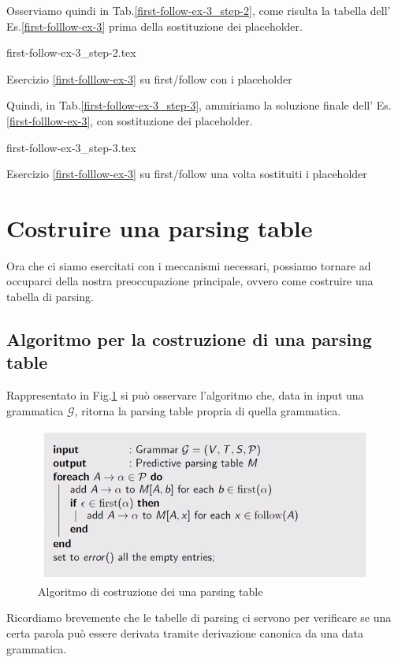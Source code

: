 \documentclass[class=book, crop=false, oneside, 12pt]{standalone}
\begin{document}
Osserviamo quindi in Tab.\ref{first-follow-ex-3_step-2}, come risulta la tabella dell' Es.\ref{first-folllow-ex-3} prima della sostituzione dei placeholder.
\begin{table}[H]
	\centering
	{first-follow-ex-3_step-2.tex}
    \caption{Esercizio \ref{first-folllow-ex-3} su first/follow con i placeholder}
    \label{first-follow-ex-3_step-2}
\end{table}
Quindi, in Tab.\ref{first-follow-ex-3_step-3}, ammiriamo la soluzione finale dell' Es.\ref{first-folllow-ex-3}, con sostituzione dei placeholder.
\begin{table}[H]
	\centering
	{first-follow-ex-3_step-3.tex}
    \caption{Esercizio \ref{first-folllow-ex-3} su first/follow una volta sostituiti i placeholder}
    \label{first-follow-ex-3_step-3}
\end{table}

\section{Costruire una parsing table}
Ora che ci siamo esercitati con i meccanismi necessari, possiamo tornare ad occuparci della nostra preoccupazione principale, ovvero come costruire una tabella di parsing.

\subsection{Algoritmo per la costruzione di una parsing table}
Rappresentato in Fig.\ref{algoritmo_parsing-table} si può osservare l'algoritmo che, data in input una grammatica \(\mathcal{G}\), ritorna la parsing table propria di quella grammatica. 
\begin{figure}[htb]
    \centering
    \includegraphics[width=.8\textwidth]{algoritmo_parsing-table.png}
    \caption{Algoritmo di costruzione dei una parsing table}
    \label{algoritmo_parsing-table}
\end{figure}
Ricordiamo brevemente che le tabelle di parsing ci servono per verificare se una certa parola può essere derivata tramite derivazione canonica da una data grammatica.
\end{document}
